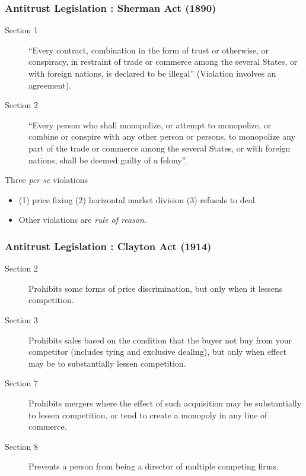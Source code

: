 \documentclass[xcolor=pdftex,dvipsnames,table,mathserif,aspectratio=169]{beamer}
\begin{document}
\begin{frame}
\frametitle{Antitrust Legislation : Sherman Act (1890)}
 \begin{description}
\item [Section 1]``Every contract, combination in the form of trust or otherwise, or conspiracy, in restraint of trade or commerce among the several States, or with foreign nations, is declared to be illegal'' (Violation involves an \alert{agreement}).
\item [Section 2] ``Every person who shall monopolize, or attempt to monopolize, or combine or conspire with any other person or persons, to monopolize any part of the trade or commerce among the several States, or with foreign nations, shall be deemed guilty of a felony''.
 \end{description}
 Three \textit{per se} violations
 \begin{itemize}
 \item (1) price fixing (2) horizontal market division (3) refusals to deal.
 \item Other violations are \textit{rule of reason}.
 \end{itemize}
 
\end{frame}

\begin{frame}
\frametitle{Antitrust Legislation : Clayton Act (1914)}
 \begin{description}
\item [Section 2] Prohibits some forms of price discrimination, but only when it lessens competition.
\item [Section 3] Prohibits sales based on the condition that the buyer not buy from your competitor (includes tying and exclusive dealing), but only when effect may be to substantially lessen competition.
\item [Section 7] Prohibits mergers where the effect of such acquisition may be substantially to lessen competition, or tend to create a monopoly in any line of commerce.
\item [Section 8] Prevents a person from being a director of multiple competing firms.
 \end{description}
\end{frame}
\end{document}

